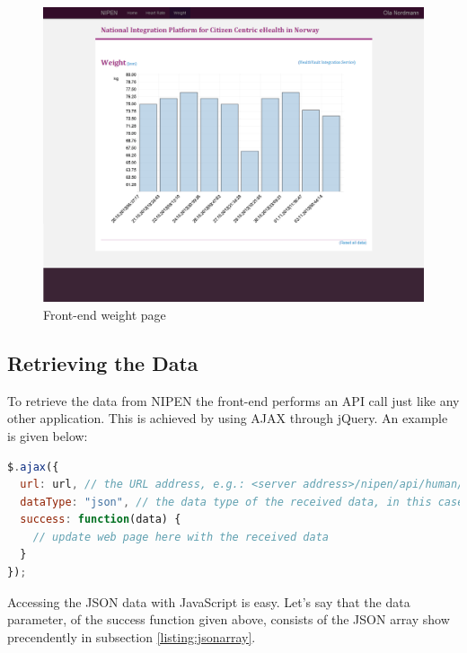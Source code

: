 \begin{figure}[H]
\centering
\includegraphics[scale=0.4]{../Figures/frontend-weight-page.png}
\caption{Front-end weight page}
\label{figure:frontend-weight-page}
\end{figure}

\subsection{Retrieving the Data}

To retrieve the data from NIPEN the front-end performs an API call just like any other application.
This is achieved by using AJAX through jQuery. An example is given below:
\begin{lstlisting}[language=JavaScript]
$.ajax({
  url: url, // the URL address, e.g.: <server address>/nipen/api/human/weights
  dataType: "json", // the data type of the received data, in this case a JSON string
  success: function(data) {
	// update web page here with the received data
  }
});
\end{lstlisting}

Accessing the JSON data with JavaScript is easy.
Let's say that the data parameter, of the success function given above, consists of the JSON array show precendently 
in subsection \ref{listing:jsonarray}.

